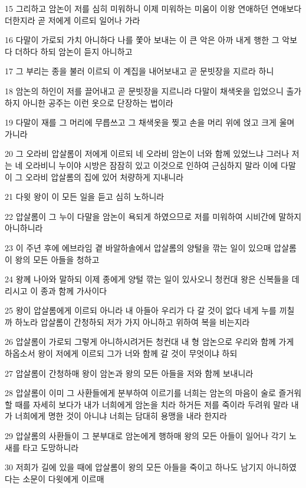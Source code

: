 \par 15 그리하고 암논이 저를 심히 미워하니 이제 미워하는 미움이 이왕 연애하던 연애보다 더한지라 곧 저에게 이르되 일어나 가라
\par 16 다말이 가로되 가치 아니하다 나를 쫓아 보내는 이 큰 악은 아까 내게 행한 그 악보다 더하다 하되 암논이 듣지 아니하고
\par 17 그 부리는 종을 불러 이르되 이 계집을 내어보내고 곧 문빗장을 지르라 하니
\par 18 암논의 하인이 저를 끌어내고 곧 문빗장을 지르니라 다말이 채색옷을 입었으니 출가하지 아니한 공주는 이런 옷으로 단장하는 법이라
\par 19 다말이 재를 그 머리에 무릅쓰고 그 채색옷을 찢고 손을 머리 위에 얹고 크게 울며 가니라
\par 20 그 오라비 압살롬이 저에게 이르되 네 오라비 암논이 너와 함께 있었느냐 그러나 저는 네 오라비니 누이야 시방은 잠잠히 있고 이것으로 인하여 근심하지 말라 이에 다말이 그 오라비 압살롬의 집에 있어 처량하게 지내니라
\par 21 다윗 왕이 이 모든 일을 듣고 심히 노하니라
\par 22 압살롬이 그 누이 다말을 암논이 욕되게 하였으므로 저를 미워하여 시비간에 말하지 아니하니라
\par 23 이 주년 후에 에브라임 곁 바알하솔에서 압살롬의 양털을 깎는 일이 있으매 압살롬이 왕의 모든 아들을 청하고
\par 24 왕께 나아와 말하되 이제 종에게 양털 깎는 일이 있사오니 청컨대 왕은 신복들을 데리시고 이 종과 함께 가사이다
\par 25 왕이 압살롬에게 이르되 아니라 내 아들아 우리가 다 갈 것이 없다 네게 누를 끼칠까 하노라 압살롬이 간청하되 저가 가지 아니하고 위하여 복을 비는지라
\par 26 압살롬이 가로되 그렇게 아니하시려거든 청컨대 내 형 암논으로 우리와 함께 가게 하옵소서 왕이 저에게 이르되 그가 너와 함께 갈 것이 무엇이냐 하되
\par 27 압살롬이 간청하매 왕이 암논과 왕의 모든 아들을 저와 함께 보내니라
\par 28 압살롬이 이미 그 사환들에게 분부하여 이르기를 너희는 암논의 마음이 술로 즐거워할 때를 자세히 보다가 내가 너희에게 암논을 치라 하거든 저를 죽이라 두려워 말라 내가 너희에게 명한 것이 아니냐 너희는 담대히 용맹을 내라 한지라
\par 29 압살롬의 사환들이 그 분부대로 암논에게 행하매 왕의 모든 아들이 일어나 각기 노새를 타고 도망하니라
\par 30 저희가 길에 있을 때에 압살롬이 왕의 모든 아들을 죽이고 하나도 남기지 아니하였다는 소문이 다윗에게 이르매
